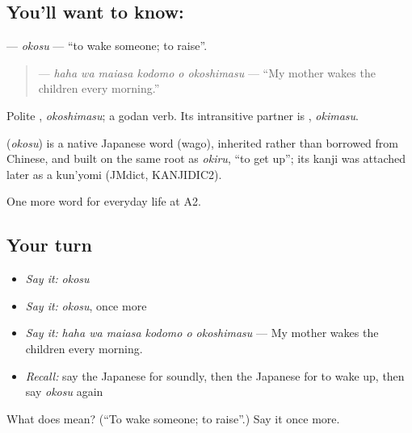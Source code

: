 \subsection*{You'll want to know: }
\textbf{} — \emph{okosu} — \textquotedblleft{}to wake someone; to raise\textquotedblright{}.

\begin{quote}
\textbf{   } — \emph{haha wa maiasa kodomo o okoshimasu} — \textquotedblleft{}My mother wakes the children every morning.\textquotedblright{}
\end{quote}

Polite \textbf{}, \emph{okoshimasu}; a godan verb. Its intransitive partner is \textbf{}, \emph{okimasu}.

\begin{cousinweb}
\textbf{} (\emph{okosu}) is a native Japanese word (wago), inherited rather than borrowed from Chinese, and built on the same root as \emph{okiru}, \textquotedblleft{}to get up\textquotedblright{}; its kanji was attached later as a kun'yomi (JMdict, KANJIDIC2).
\end{cousinweb}

\begin{grammarlens}[title={What you've built}]
One more word for everyday life at A2.
\end{grammarlens}

\subsection*{Your turn}
\begin{itemize}
\raggedright
  \item \emph{Say it:} \emph{okosu}
  \item \emph{Say it:} \emph{okosu}, once more
  \item \emph{Say it:} \emph{haha wa maiasa kodomo o okoshimasu} — My mother wakes the children every morning.
  \item \emph{Recall:} say the Japanese for soundly, then the Japanese for to wake up, then say \emph{okosu} again
\end{itemize}

\begin{tcolorbox}[breakable,colback=teal!4,colframe=teal!35!black,title={Before you move on}]
What does  mean? (\textquotedblleft{}To wake someone; to raise\textquotedblright{}.) Say it once more.
\end{tcolorbox}

